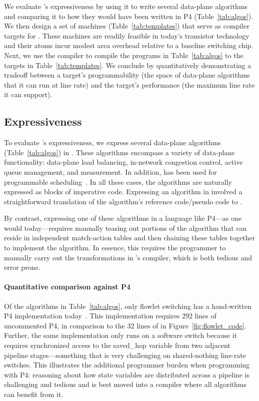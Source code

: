 We evaluate \pktlanguage's expressiveness by using it to write several
data-plane algorithms and comparing it to how they would have been written in
P4 (Table~\ref{tab:algos}). We then design a set of \absmachine machines
(Table~\ref{tab:templates}) that serve as compiler targets for \pktlanguage.
These machines are readily feasible in today's transistor technology and their
atoms incur modest area overhead relative to a baseline switching chip. Next,
we use the \pktlanguage compiler to compile the programs in
Table~\ref{tab:algos} to the targets in Table~\ref{tab:templates}.  We conclude
by quantitatively demonstrating a tradeoff between a target's programmability
(the space of data-plane algorithms that it can run at line rate) and the
target's performance (the maximum line rate it can support).

\subsection{Expressiveness}
\label{ss:Expressiveness}

To evaluate \pktlanguage's expressiveness, we express several data-plane
algorithms (Table~\ref{tab:algos}) in \pktlanguage. These algorithms encompass
a variety of data-plane functionality: data-plane load balancing, in-network
congestion control, active queue management, and measurement. In addition,
\pktlanguage has been used for programmable scheduling~\cite{prog_sched_arxiv}.
In all these cases, the algorithms are naturally expressed as blocks of
imperative code. Expressing an algorithm in \pktlanguage involved a
straightforward translation of the algorithm's reference code/pseudo code to
\pktlanguage.

By contrast, expressing one of these algorithms in a language like P4---as one
would today---requires manually teasing out portions of the algorithm that can
reside in independent match-action tables and then chaining these tables
together to implement the algorithm. In essence, this requires the programmer
to manually carry out the transformations in \pktlanguage's compiler, which is
both tedious and error prone.

\paragraph{Quantitative comparison against P4} Of the algorithms in
Table~\ref{tab:algos}, only flowlet switching has a hand-written P4
implementation today~\cite{p4_flowlet}. This implementation requires 292 lines
of uncommented P4, in comparison to the 32 lines of \pktlanguage in
Figure~\ref{fig:flowlet_code}. Further, the same implementation only runs on a
software switch because it requires synchronized access to the saved\_hop
variable from two adjacent pipeline stages---something that is very challenging
on shared-nothing line-rate switches. This illustrates the additional
programmer burden when programming with P4: reasoning about how state variables
are distributed across a pipeline is challenging and tedious and is best moved
into a compiler where all algorithms can benefit from it.

